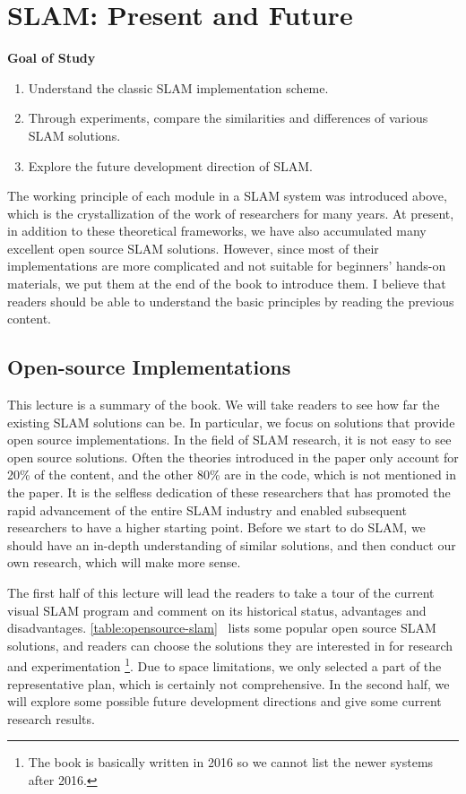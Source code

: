 \chapter{SLAM: Present and Future}
\begin{mdframed}  
	\textbf{Goal of Study}
	\begin{enumerate}[labelindent=0em,leftmargin=1.5em]
		\item Understand the classic SLAM implementation scheme.
		\item Through experiments, compare the similarities and differences of various SLAM solutions.
		\item Explore the future development direction of SLAM.
	\end{enumerate}
\end{mdframed}

The working principle of each module in a SLAM system was introduced above, which is the crystallization of the work of researchers for many years. At present, in addition to these theoretical frameworks, we have also accumulated many excellent open source SLAM solutions. However, since most of their implementations are more complicated and not suitable for beginners' hands-on materials, we put them at the end of the book to introduce them. I believe that readers should be able to understand the basic principles by reading the previous content.

\newpage
\section{Open-source Implementations}
This lecture is a summary of the book. We will take readers to see how far the existing SLAM solutions can be. In particular, we focus on solutions that provide open source implementations. In the field of SLAM research, it is not easy to see open source solutions. Often the theories introduced in the paper only account for 20\% of the content, and the other 80\% are in the code, which is not mentioned in the paper. It is the selfless dedication of these researchers that has promoted the rapid advancement of the entire SLAM industry and enabled subsequent researchers to have a higher starting point. Before we start to do SLAM, we should have an in-depth understanding of similar solutions, and then conduct our own research, which will make more sense.

The first half of this lecture will lead the readers to take a tour of the current visual SLAM program and comment on its historical status, advantages and disadvantages. \autoref{table:opensource-slam}~ lists some popular open source SLAM solutions, and readers can choose the solutions they are interested in for research and experimentation \footnote{The book is basically written in 2016 so we cannot list the newer systems after 2016.}. Due to space limitations, we only selected a part of the representative plan, which is certainly not comprehensive. In the second half, we will explore some possible future development directions and give some current research results.

